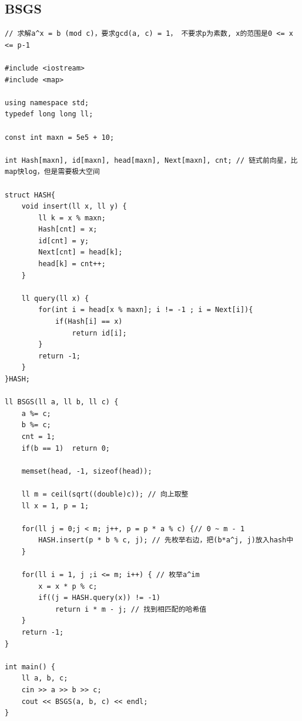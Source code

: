\documentclass[twoside]{article}
\begin{document}
\subsection{BSGS}
\begin{lstlisting}
// 求解a^x = b (mod c)，要求gcd(a, c) = 1， 不要求p为素数, x的范围是0 <= x <= p-1

#include <iostream>
#include <map>

using namespace std;
typedef long long ll;

const int maxn = 5e5 + 10;

int Hash[maxn], id[maxn], head[maxn], Next[maxn], cnt; // 链式前向星，比map快log，但是需要极大空间

struct HASH{
    void insert(ll x, ll y) {
        ll k = x % maxn;
        Hash[cnt] = x;
        id[cnt] = y;
        Next[cnt] = head[k];
        head[k] = cnt++;
    }

    ll query(ll x) {
        for(int i = head[x % maxn]; i != -1 ; i = Next[i]){
            if(Hash[i] == x)
                return id[i];
        }
        return -1;
    }
}HASH;

ll BSGS(ll a, ll b, ll c) {
    a %= c;
    b %= c;
    cnt = 1;
    if(b == 1)  return 0; 

    memset(head, -1, sizeof(head));

    ll m = ceil(sqrt((double)c)); // 向上取整
    ll x = 1, p = 1;

    for(ll j = 0;j < m; j++, p = p * a % c) {// 0 ~ m - 1
        HASH.insert(p * b % c, j); // 先枚举右边，把(b*a^j, j)放入hash中
    }

    for(ll i = 1, j ;i <= m; i++) { // 枚举a^im
        x = x * p % c;
        if((j = HASH.query(x)) != -1)
            return i * m - j; // 找到相匹配的哈希值
    }
    return -1;
}

int main() {
    ll a, b, c;
    cin >> a >> b >> c;
    cout << BSGS(a, b, c) << endl;
}
\end{lstlisting}
\end{document}
